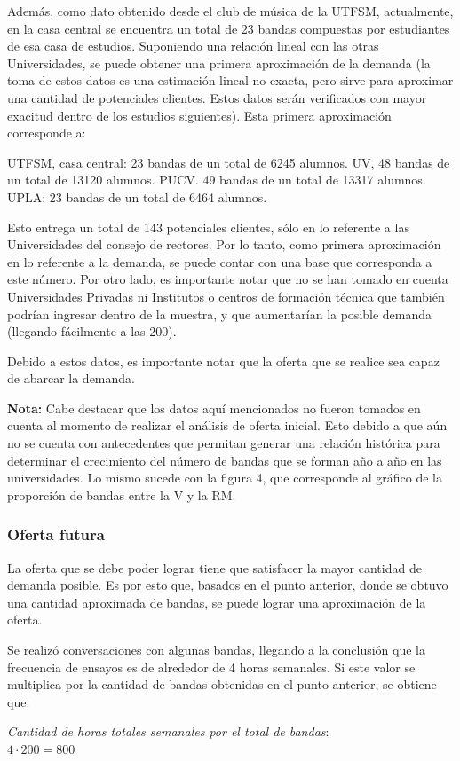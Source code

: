 Además, como dato obtenido desde el club de música de la UTFSM, actualmente, 
en la casa central se encuentra un total de 23 bandas compuestas por estudiantes
de esa casa de estudios. Suponiendo una relación lineal con las otras 
Universidades, se puede obtener una primera aproximación de la demanda 
(la toma de estos datos es una estimación lineal no exacta, pero sirve para 
aproximar una cantidad de potenciales clientes. Estos datos serán verificados 
con mayor exacitud dentro de los estudios siguientes). Esta primera 
aproximación corresponde a:

UTFSM, casa central: 23 bandas de un total de 6245 alumnos.
UV, 48 bandas de un total de 13120 alumnos.
PUCV. 49 bandas de un total de 13317 alumnos.
UPLA: 23 bandas de un total de 6464 alumnos.

Esto entrega un total de 143 potenciales clientes, sólo en lo referente a las 
Universidades del consejo de rectores. Por lo tanto, como primera aproximación 
en lo referente a la demanda, se puede contar con una base que corresponda 
a este número. Por otro lado, es importante notar que no se han tomado en 
cuenta Universidades Privadas ni Institutos o centros de formación técnica 
que también podrían ingresar dentro de la muestra, y que aumentarían la 
posible demanda (llegando fácilmente a las 200). 

Debido a estos datos, es importante notar que la oferta que se realice sea capaz
de abarcar la demanda.  

\textbf{Nota:} Cabe destacar que los datos aquí mencionados no fueron tomados en cuenta 
al momento de realizar el análisis de oferta inicial. Esto debido a que aún no se
cuenta con antecedentes que permitan generar una relación histórica para determinar
el crecimiento del número de bandas que se forman año a año en las universidades.
Lo mismo sucede con la figura 4, que corresponde al gráfico de la proporción de bandas
entre la V y la RM.


\subsubsection{Oferta futura}

La oferta que se debe poder lograr tiene que satisfacer la mayor cantidad
de demanda posible. Es por esto que, basados en el punto anterior, donde se
obtuvo una cantidad aproximada de bandas, se puede lograr una aproximación de 
la oferta.

Se realizó conversaciones con algunas bandas, llegando a la conclusión que
la frecuencia de ensayos es de alrededor de 4 horas semanales. Si este valor
se multiplica por la cantidad de bandas obtenidas en el punto anterior, 
se obtiene que:
\begin{center}
	\emph{Cantidad de horas totales semanales por el total de bandas}: \\
	$4\cdot 200 = 800$
\end{center} 

